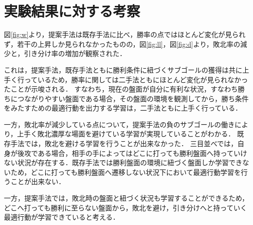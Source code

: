 \section{実験結果に対する考察}
図\ref{fig:w}より，提案手法は既存手法に比べ，勝率の点ではほとんど変化が見られず，若干の上昇しか見られなかったものの，図\ref{fig:ll}，図\ref{fig:d}より，敗北率の減少と，引き分け率の増加が観察された．

これは，提案手法，既存手法ともに勝利条件に紐づくサブゴールの獲得は共に上手く行っているため，勝率に関しては二手法ともにほとんど変化が見られなかったことが示唆される．
すなわち，現在の盤面が自分に有利な状況，すなわち勝ちにつながりやすい盤面である場合，その盤面の環境を観測してから，勝ち条件をみたすための最適行動を出力する学習は，二手法ともに上手く行っている．

一方，敗北率が減少している点について，提案手法の負のサブゴールの働きにより，上手く敗北濃厚な場面を避けている学習が実現していることがわかる．
既存手法では，敗北を避ける学習を行うことが出来なかった．
三目並べでは，自身が後攻である場合，相手の手によってはどこに打っても勝利盤面へ持っていけない状況が存在する．既存手法では勝利盤面の環境に紐づく盤面しか学習できないため，どこに打っても勝利盤面へ遷移しない状況下において最適行動学習を行うことが出来ない．

一方，提案手法では，敗北時の盤面と紐づく状況も学習することができるため，どこへ打っても勝利に至らない盤面から，敗北を避け，引き分けへと持っていく最適行動が学習できていると考える．

